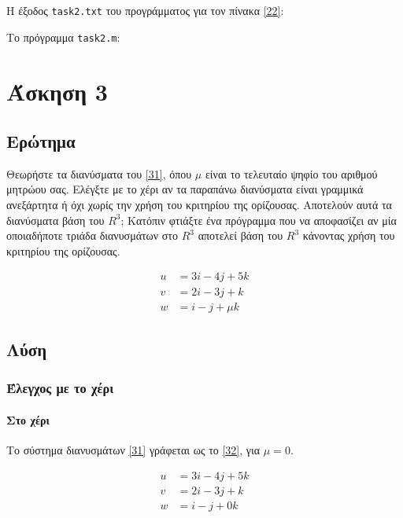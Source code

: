 \documentclass[12pt, fleqn, leqno]{extreport}
\begin{document}
Η έξοδος \lstinline[language={}]{task2.txt} του προγράμματος για τον πίνακα \eqref{22}:


Το πρόγραμμα \lstinline[language={}]{task2.m}:



\chapter{Άσκηση 3}
\section{Ερώτημα}

Θεωρήστε τα διανύσματα του \eqref{31}, όπου $\mu$ είναι το τελευταίο ψηφίο του αριθμού μητρώου σας. Ελέγξτε με το χέρι αν τα παραπάνω διανύσματα είναι γραμμικά ανεξάρτητα ή όχι χωρίς την χρήση του κριτηρίου της ορίζουσας. Αποτελούν αυτά τα διανύσματα βάση του $R^{3}$; Κατόπιν φτιάξτε ένα πρόγραμμα που να αποφασίζει αν μία οποιαδήποτε τριάδα διανυσμάτων στο $R^{3}$ αποτελεί βάση του $R^{3}$ κάνοντας χρήση του κριτηρίου της ορίζουσας.

\begin{equation}%
    \begin{aligned}
        u & = 3i - 4j + 5k  \\
        v & = 2i - 3j + k   \\
        w & = i - j + \mu k
    \end{aligned}\label{31}
\end{equation}

\newpage
\section{Λύση}
\subsection{Έλεγχος με το χέρι}
\subsubsection{Στο χέρι}

Το σύστημα διανυσμάτων \eqref{31} γράφεται ως το \eqref{32}, για $\mu = 0$.

\begin{equation}%
    \begin{aligned}
        u & = 3i - 4j + 5k \\
        v & = 2i - 3j + k  \\
        w & = i - j + 0k
    \end{aligned}\label{32}
\end{equation}
\end{document}
